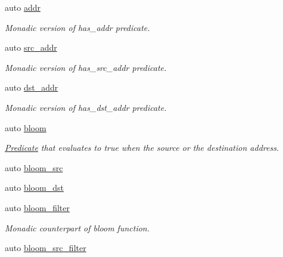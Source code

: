 \begin{DoxyCompactItemize}
auto \hyperlink{namespacepfq_1_1lang_1_1anonymous__namespace_02default_8hpp_03_a13cabe468839119d8d68540e3c60718b}{addr}
\begin{DoxyCompactList}\small\item\em Monadic version of {\ttfamily has\+\_\+addr} predicate. \end{DoxyCompactList}\item 
auto \hyperlink{namespacepfq_1_1lang_1_1anonymous__namespace_02default_8hpp_03_a2ee09b5a65a64d60bc797b2ecd1c8a4a}{src\+\_\+addr}
\begin{DoxyCompactList}\small\item\em Monadic version of {\ttfamily has\+\_\+src\+\_\+addr} predicate. \end{DoxyCompactList}\item 
auto \hyperlink{namespacepfq_1_1lang_1_1anonymous__namespace_02default_8hpp_03_a3f51de44baa33ff19a94995945636072}{dst\+\_\+addr}
\begin{DoxyCompactList}\small\item\em Monadic version of {\ttfamily has\+\_\+dst\+\_\+addr} predicate. \end{DoxyCompactList}\item 
auto \hyperlink{namespacepfq_1_1lang_1_1anonymous__namespace_02default_8hpp_03_abfcd230137acb93cfd99f7a0a7c1f17f}{bloom}
\begin{DoxyCompactList}\small\item\em \hyperlink{structpfq_1_1lang_1_1Predicate}{Predicate} that evaluates to {\ttfamily true} when the source or the destination address. \end{DoxyCompactList}\item 
auto \hyperlink{namespacepfq_1_1lang_1_1anonymous__namespace_02default_8hpp_03_aa2a8ff506d61e93d8eca4419513970f4}{bloom\+\_\+src}
\item 
auto \hyperlink{namespacepfq_1_1lang_1_1anonymous__namespace_02default_8hpp_03_ac1c667000a13acfbda8490d5748b91c4}{bloom\+\_\+dst}
\item 
auto \hyperlink{namespacepfq_1_1lang_1_1anonymous__namespace_02default_8hpp_03_a3a5eda5d7a49e279941725df8388378d}{bloom\+\_\+filter}
\begin{DoxyCompactList}\small\item\em Monadic counterpart of {\ttfamily bloom} function. \end{DoxyCompactList}\item 
auto \hyperlink{namespacepfq_1_1lang_1_1anonymous__namespace_02default_8hpp_03_a04d4dfefacab3230f7d17f0f797cd37e}{bloom\+\_\+src\+\_\+filter}

\end{DoxyCompactItemize}
